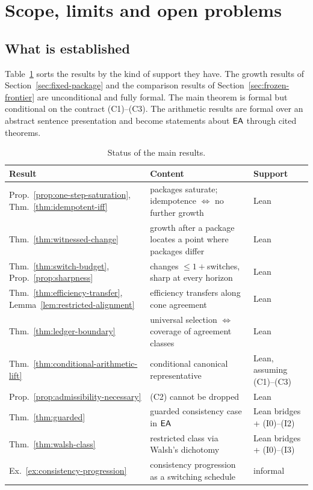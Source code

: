 \section{Scope, limits and open problems}\label{sec:scope-limits}

\subsection{What is established}

Table~\ref{tab:status} sorts the results by the kind of support they have. The growth results of Section~\ref{sec:fixed-package} and the comparison results of Section~\ref{sec:frozen-frontier} are unconditional and fully formal. The main theorem is formal but conditional on the contract (C1)--(C3). The arithmetic results are formal over an abstract sentence presentation and become statements about $\mathsf{EA}$ through cited theorems.

\begin{table}[t]
\caption{Status of the main results.}
\label{tab:status}
\centering
\small
\begin{tabularx}{\textwidth}{@{}l X l@{}}
\toprule
Result & Content & Support \\
\midrule
Prop.~\ref{prop:one-step-saturation}, Thm.~\ref{thm:idempotent-iff} & packages saturate; idempotence $\Leftrightarrow$ no further growth & Lean \\
Thm.~\ref{thm:witnessed-change} & growth after a package locates a point where packages differ & Lean \\
Thm.~\ref{thm:switch-budget}, Prop.~\ref{prop:sharpness} & changes $\le 1+{}$switches, sharp at every horizon & Lean \\
Thm.~\ref{thm:efficiency-transfer}, Lemma~\ref{lem:restricted-alignment} & efficiency transfers along cone agreement & Lean \\
Thm.~\ref{thm:ledger-boundary} & universal selection $\Leftrightarrow$ coverage of agreement classes & Lean \\
Thm.~\ref{thm:conditional-arithmetic-lift} & conditional canonical representative & Lean, assuming (C1)--(C3) \\
Prop.~\ref{prop:admissibility-necessary} & (C2) cannot be dropped & Lean \\
Thm.~\ref{thm:guarded} & guarded consistency case in $\mathsf{EA}$ & Lean bridges + (I0)--(I2) \\
Thm.~\ref{thm:walsh-class} & restricted class via Walsh's dichotomy & Lean bridges + (I0)--(I3) \\
Ex.~\ref{ex:consistency-progression} & consistency progression as a switching schedule & informal \\
\bottomrule
\end{tabularx}
\end{table}

